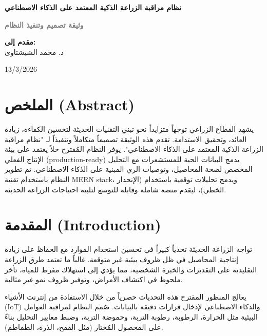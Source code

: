 \documentclass[12pt,a4paper]{article}
\begin{document}
\begin{titlepage}
    \centering
    \vspace*{3cm}
    
    {\Huge \textbf{\color{primary}نظام مراقبة الزراعة الذكية المعتمد على الذكاء الاصطناعي}\par}
    \vspace{1cm}
    {\Large \textcolor{gray}{\textbf{وثيقة تصميم وتنفيذ النظام}}\par}
    
    \vspace{3cm}
    
    {\Large \textbf{مقدم إلى:}\\ د. محمد الشيشتاوى\par}
    \vspace{2.5cm}
    
    {\Large 13/3/2026\par}
\end{titlepage}

\newpage

\section*{الملخص (Abstract)}
يشهد القطاع الزراعي توجهاً متزايداً نحو تبني التقنيات الحديثة لتحسين الكفاءة، زيادة العائد، وتحقيق الاستدامة. تقدم هذه الوثيقة تصميماً متكاملاً وتنفيذاً لـ "نظام مراقبة الزراعة الذكية المعتمد على الذكاء الاصطناعي". يوفر النظام المُقترح حلاً يعتمد على بيئة الإنتاج الفعلي (production-ready) يدمج البيانات الحية للمستشعرات مع التحليل المخصص لصحة المحاصيل، وتوصيات الري المبنية على الذكاء الاصطناعي. تم تطوير النظام باستخدام تقنية MERN stack، ويدمج تحليلات توقعية باستخدام (الإنحدار الخطي)، ليقدم منصة شاملة وقابلة للتوسع لتلبية احتياجات الزراعة الحديثة.

\vspace{0.5cm}

\section{المقدمة (Introduction)}
تواجه الزراعة الحديثة تحدياً كبيراً في تحسين استخدام الموارد مع الحفاظ على زيادة إنتاجية المحاصيل في ظل ظروف بيئية غير متوقعة. غالباً ما تعتمد طرق الزراعة التقليدية على التقديرات والخبرة الشخصية، مما يؤدي إلى استهلاك مفرط للمياه، تأخر ملحوظ في اكتشاف الأمراض، وتوفير ظروف نمو غير مثالية.

يعالج المنظور المقترح هذه التحديات حصرياً من خلال الاستفادة من إنترنت الأشياء (IoT) والذكاء الاصطناعي لإدخال قرارات دقيقة بالبيانات. صُمم النظام لمراقبة العوامل البيئية مثل الحرارة، الرطوبة، رطوبة التربة، وحموضة التربة، وضبط معايير التحليل بناءً على المحصول المُختار (مثل القمح، الذرة، الطماطم).
\end{document}

